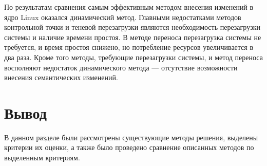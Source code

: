 По результатам сравнения самым эффективным методом внесения изменений в ядро Linux оказался динамический метод. Главными недостатками методов контрольной точки и теневой перезагрузки являются необходимость перезагрузки системы и наличие времени простоя. В методе переноса перезагрузка системы не требуется, и время простоя снижено, но потребление ресурсов увеличивается в два раза. Кроме того методы, требующие перезагрузки системы, и метод переноса восполняют недостаток динамического метода --- отсутствие возможности внесения семантических изменений.

\section{Вывод}

В данном разделе были рассмотрены существующие методы решения, выделены критерии их оценки, а также было проведено сравнение описанных методов по выделенным критериям.
